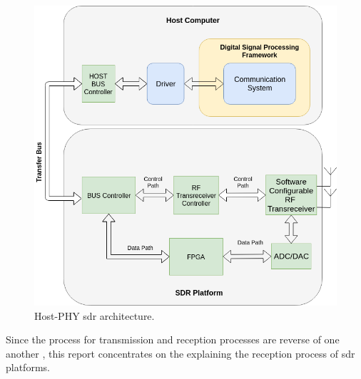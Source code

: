 \begin{figure}[h!]
\centering
\includegraphics[width=\textwidth]{Figure/Host_Phy.png}
\caption{Host-PHY \cite{nychis_enabling_nodate} \ac{sdr} architecture.}
\label{host_PHY}
\end{figure}


Since the process for transmission and reception processes are reverse of one another , this report concentrates on the explaining the reception process of \ac{sdr} platforms.

